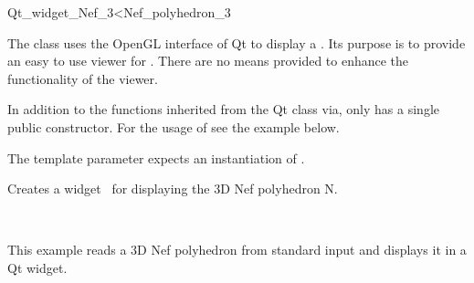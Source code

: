 
\ccRefPageBegin



\begin{ccRefClass}{Qt_widget_Nef_3<Nef_polyhedron_3}

\ccDefinition
 
The class  uses the OpenGL interface of Qt to display a
. Its purpose is to provide an easy to use viewer for 
. There are no means provided to enhance the 
functionality of the viewer.

In addition to the functions inherited from the Qt class  via,
  only has a single public 
constructor. For the usage of  see the example 
below.


\ccParameters
The template parameter expects an instantiation of .

\ccCreation
{}

{Creates a widget \ccVar\ for displaying the 3D Nef polyhedron N.}

\ccSeeAlso

\\

\ccExample
This example reads a 3D Nef polyhedron from standard input and displays it
in a Qt widget.


\end{ccRefClass}

\ccRefPageEnd
